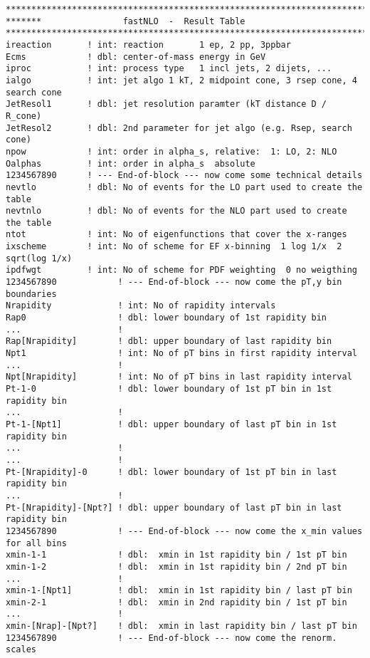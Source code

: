 {\small \footnotesize
\begin{verbatim} 
******************************************************************************
*******                fastNLO  -  Result Table  
******************************************************************************
ireaction       ! int: reaction       1 ep, 2 pp, 3ppbar
Ecms            ! dbl: center-of-mass energy in GeV
iproc           ! int: process type   1 incl jets, 2 dijets, ...
ialgo           ! int: jet algo 1 kT, 2 midpoint cone, 3 rsep cone, 4 search cone 
JetResol1       ! dbl: jet resolution paramter (kT distance D / R_cone)
JetResol2       ! dbl: 2nd parameter for jet algo (e.g. Rsep, search cone)
npow            ! int: order in alpha_s, relative:  1: LO, 2: NLO
Oalphas         ! int: order in alpha_s  absolute
1234567890      ! --- End-of-block --- now come some technical details
nevtlo          ! dbl: No of events for the LO part used to create the table
nevtnlo         ! dbl: No of events for the NLO part used to create the table
ntot            ! int: No of eigenfunctions that cover the x-ranges 
ixscheme        ! int: No of scheme for EF x-binning  1 log 1/x  2 sqrt(log 1/x)
ipdfwgt         ! int: No of scheme for PDF weighting  0 no weigthing
1234567890            ! --- End-of-block --- now come the pT,y bin boundaries
Nrapidity             ! int: No of rapidity intervals
Rap0                  ! dbl: lower boundary of 1st rapidity bin
...                   !
Rap[Nrapidity]        ! dbl: upper boundary of last rapidity bin
Npt1                  ! int: No of pT bins in first rapidity interval
...                   !
Npt[Nrapidity]        ! int: No of pT bins in last rapidity interval
Pt-1-0                ! dbl: lower boundary of 1st pT bin in 1st rapidity bin
...                   !
Pt-1-[Npt1]           ! dbl: upper boundary of last pT bin in 1st rapidity bin
...                   !
...                   !
Pt-[Nrapidity]-0      ! dbl: lower boundary of 1st pT bin in last rapidity bin
...                   ! 
Pt-[Nrapidity]-[Npt?] ! dbl: upper boundary of last pT bin in last rapidity bin
1234567890            ! --- End-of-block --- now come the x_min values for all bins
xmin-1-1              ! dbl:  xmin in 1st rapidity bin / 1st pT bin
xmin-1-2              ! dbl:  xmin in 1st rapidity bin / 2nd pT bin
...                   !
xmin-1-[Npt1]         ! dbl:  xmin in 1st rapidity bin / last pT bin
xmin-2-1              ! dbl:  xmin in 2nd rapidity bin / 1st pT bin
...                   !
xmin-[Nrap]-[Npt?]    ! dbl:  xmin in last rapidity bin / last pT bin
1234567890            ! --- End-of-block --- now come the renorm. scales

\end{verbatim}}
